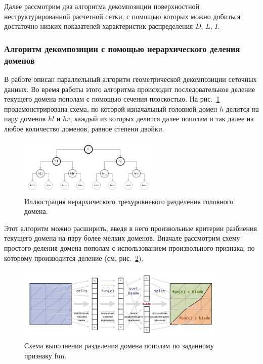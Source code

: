 Далее рассмотрим два алгоритма декомпозиции поверхностной неструктурированной расчетной сетки, с помощью которых можно добиться достаточно низких показателей характеристик распределения $D$, $L$, $I$.

\subsubsection{Алгоритм декомпозиции с помощью иерархического деления доменов}\label{sec:text_2_decompsurf_hierarchical}

В работе \cite{Golovchenko2020Decomp} описан параллельный алгоритм геометрической декомпозиции сеточных данных.
Во время работы этого алгоритма происходит последовательное деление текущего домена пополам с помощью сечения плоскостью.
На рис.~\ref{fig:text_2_decompsurf_hierarchical} продемонстрирована схема, по которой изначальный головной домен $h$ делится на пару доменов $hl$ и $hr$, каждый из которых делится далее пополам и так далее на любое количество доменов, равное степени двойки.

\begin{figure}[ht]
\centering
\includegraphics[width=0.6\textwidth]{fig/par_hierarchical.pdf}
\singlespacing
{}\caption{Иллюстрация иерархического трехуровневого разделения головного домена.}
\label{fig:text_2_decompsurf_hierarchical}
\end{figure}

Этот алгоритм можно расширить, введя в него произвольные критерии разбиения текущего домена на пару более мелких доменов.
Вначале рассмотрим схему простого деления домена пополам с использованием произвольного признака, по которому производится деление (см. рис.~\ref{fig:text_2_decompsurf_split}).

\begin{figure}[ht]
\centering
\includegraphics[width=0.9\textwidth]{fig/par_split.pdf}
\singlespacing
{}\caption{Схема выполнения разделения домена пополам по заданному признаку fun.}
\label{fig:text_2_decompsurf_split}
\end{figure}

